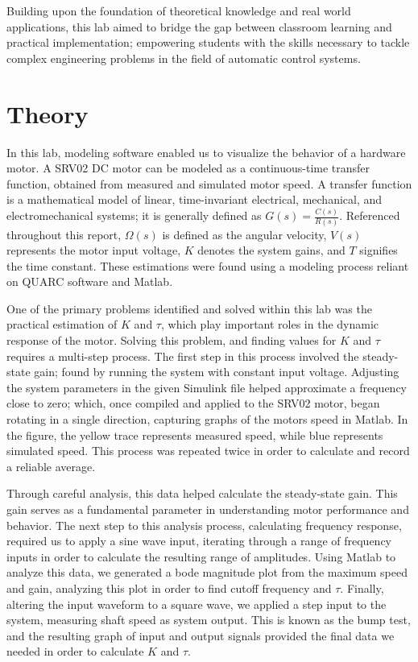 \documentclass[conference,compsoc]{IEEEtran}
\begin{document}
Building upon the foundation of theoretical knowledge and real world applications, this lab aimed to bridge the gap between classroom learning and practical implementation; empowering students with the skills necessary to tackle complex engineering problems in the field of automatic control systems.
\section{Theory}
In this lab, modeling software enabled us to visualize the behavior of a hardware motor. A SRV02 DC motor can be modeled as a continuous-time transfer function, obtained from measured and simulated motor speed. A transfer function is a mathematical model of linear, time-invariant electrical, mechanical, and electromechanical systems; it is generally defined as $G(s)=\frac{C(s)}{R(s)}$. Referenced throughout this report, $\Omega(s)$ is defined as the angular velocity, $V(s)$ represents the motor input voltage, $K$ denotes the system gains, and $T$ signifies the time constant. These estimations were found using a modeling process reliant on QUARC software and Matlab.

One of the primary problems identified and solved within this lab was the practical estimation of $K$ and $\tau$, which play important roles in the dynamic response of the motor. Solving this problem, and finding values for $K$ and $\tau$ requires a multi-step process. The first step in this process involved the steady-state gain; found by running the system with constant input voltage. Adjusting the system parameters in the given Simulink file helped approximate a frequency close to zero; which, once compiled and applied to the SRV02 motor, began rotating in a single direction, capturing graphs of the motors speed in Matlab. In the figure, the yellow trace represents measured speed, while blue represents simulated speed. This process was repeated twice in order to calculate and record a reliable average.

Through careful analysis, this data helped calculate the steady-state gain. This gain serves as a fundamental parameter in understanding motor performance and behavior. The next step to this analysis process, calculating frequency response, required us to apply a sine wave input, iterating through a range of frequency inputs in order to calculate the resulting range of amplitudes. Using Matlab to analyze this data, we generated a bode magnitude plot from the maximum speed and gain, analyzing this plot in order to find cutoff frequency and $\tau$. Finally, altering the input waveform to a square wave, we applied a step input to the system, measuring shaft speed as system output. This is known as the bump test, and the resulting graph of input and output signals provided the final data we needed in order to calculate $K$ and $\tau$. 
\end{document}

